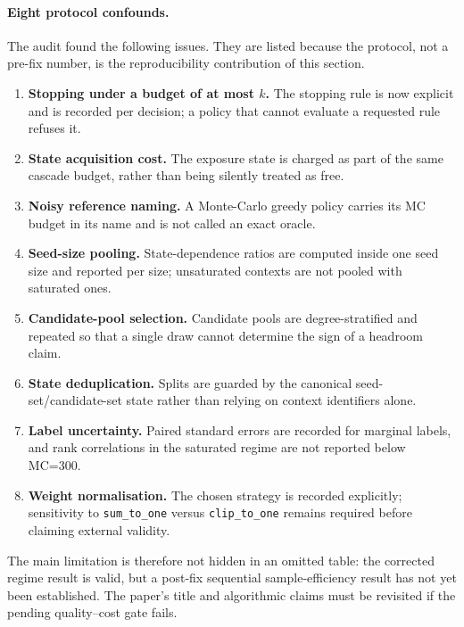 \paragraph{Eight protocol confounds.}
The audit found the following issues.  They are listed because the protocol, not a pre-fix number,
is the reproducibility contribution of this section.

\begin{enumerate}
  \item \textbf{Stopping under a budget of at most $k$.} The stopping rule is now explicit and is
        recorded per decision; a policy that cannot evaluate a requested rule refuses it.
  \item \textbf{State acquisition cost.} The exposure state is charged as part of the same cascade
        budget, rather than being silently treated as free.
  \item \textbf{Noisy reference naming.} A Monte-Carlo greedy policy carries its MC budget in its
        name and is not called an exact oracle.
  \item \textbf{Seed-size pooling.} State-dependence ratios are computed inside one seed size and
        reported per size; unsaturated contexts are not pooled with saturated ones.
  \item \textbf{Candidate-pool selection.} Candidate pools are degree-stratified and repeated so
        that a single draw cannot determine the sign of a headroom claim.
  \item \textbf{State deduplication.} Splits are guarded by the canonical seed-set/candidate-set
        state rather than relying on context identifiers alone.
  \item \textbf{Label uncertainty.} Paired standard errors are recorded for marginal labels, and
        rank correlations in the saturated regime are not reported below MC=300.
  \item \textbf{Weight normalisation.} The chosen strategy is recorded explicitly; sensitivity to
        \texttt{sum\_to\_one} versus \texttt{clip\_to\_one} remains required before claiming external validity.
\end{enumerate}

The main limitation is therefore not hidden in an omitted table: the corrected regime result is
valid, but a post-fix sequential sample-efficiency result has not yet been established.  The
paper's title and algorithmic claims must be revisited if the pending quality--cost gate fails.
